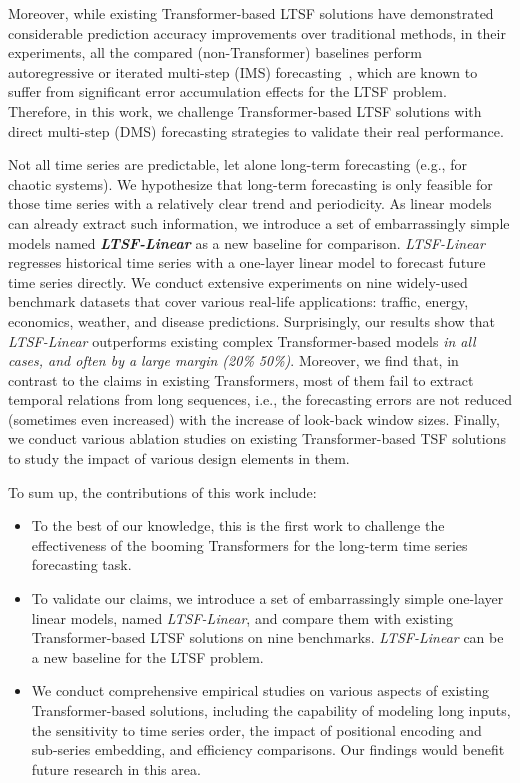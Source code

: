 \documentclass[10pt,twocolumn,letterpaper]{article}
\newcommand{\modelname}{\emph{LTSF-Linear}\xspace}
\begin{document}
Moreover, while existing Transformer-based LTSF solutions have demonstrated considerable prediction accuracy improvements over traditional methods, 
in their experiments, all the compared (non-Transformer) baselines perform autoregressive or iterated multi-step (IMS) forecasting~\cite{ariyo2014arima,DavidSalinas2017DeepARPF,DzmitryBahdanau2014NeuralMT,SeanJTaylor2017ForecastingAS}, which are known to suffer from significant error accumulation effects for the LTSF problem. Therefore, in this work, we challenge Transformer-based LTSF solutions with direct multi-step (DMS) forecasting strategies to validate their real performance.  

Not all time series are predictable, let alone long-term forecasting (e.g., for chaotic systems). We hypothesize that long-term forecasting is only feasible for those time series with a relatively clear trend and periodicity. As linear models can already extract such information, we introduce a set of embarrassingly simple models named \textbf{\modelname} as a new baseline for comparison. 
\modelname regresses historical time series with a one-layer linear model to forecast future time series directly. We conduct extensive experiments on nine widely-used benchmark datasets that cover various real-life applications: traffic, energy, economics, weather, and disease predictions.
Surprisingly, our results show that \modelname outperforms existing complex Transformer-based models \emph{in all cases, and often by a large margin (20\%  50\%)}. 
Moreover, we find that, in contrast to the claims in existing Transformers, most of them fail to extract temporal relations from long sequences, i.e., the forecasting errors are not reduced (sometimes even increased) with the increase of look-back window sizes. Finally, we conduct various ablation studies on existing Transformer-based TSF solutions to study the impact of various design elements in them. 

To sum up, the contributions of this work include:

\begin{itemize}

\item To the best of our knowledge, this is the first work to challenge the effectiveness of the booming Transformers for the long-term time series forecasting task. 

\item To validate our claims, we introduce a set of embarrassingly simple one-layer linear models, named \modelname, and compare them with existing Transformer-based LTSF solutions on nine benchmarks. \modelname can be a new baseline for the LTSF problem.

\item We conduct comprehensive empirical studies on various aspects of existing Transformer-based solutions, including the capability of modeling long inputs, the sensitivity to time series order, the impact of positional encoding and sub-series embedding, and efficiency comparisons. Our findings would benefit future research in this area. 


\end{itemize}
\end{document}
